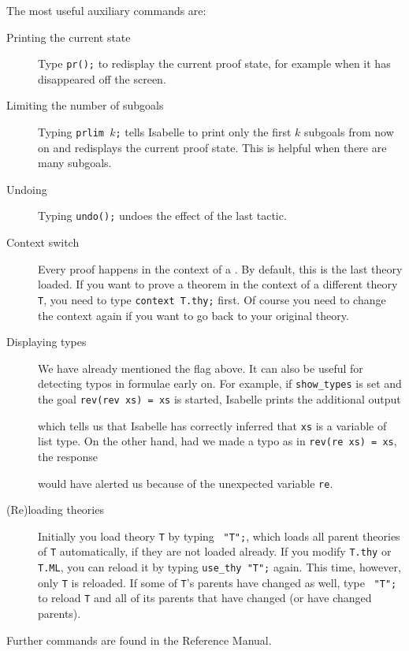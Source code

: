 The most useful auxiliary commands are:
\begin{description}
\item[Printing the current state]
Type \texttt{pr();} to redisplay the current proof state, for example when it
has disappeared off the screen.
\item[Limiting the number of subgoals]
Typing \texttt{prlim $k$;} tells Isabelle to print only the first $k$
subgoals from now on and redisplays the current proof state. This is helpful
when there are many subgoals.
\item[Undoing] Typing \texttt{undo();} undoes the effect of the last
tactic.
\item[Context switch] Every proof happens in the context of a
  . By default, this is the last theory loaded. If
  you want to prove a theorem in the context of a different theory
  \texttt{T}, you need to type \texttt{context T.thy;}
  first. Of course you need to change the context again if you want to go
  back to your original theory.
\item[Displaying types] We have already mentioned the flag
   above. It can also be useful for detecting typos in
  formulae early on. For example, if \texttt{show_types} is set and the goal
  \texttt{rev(rev xs) = xs} is started, Isabelle prints the additional output
\begin{ttbox}
\end{ttbox}
which tells us that Isabelle has correctly inferred that
\texttt{xs} is a variable of list type. On the other hand, had we
made a typo as in \texttt{rev(re xs) = xs}, the response
\begin{ttbox}
\end{ttbox}
would have alerted us because of the unexpected variable \texttt{re}.
\item[(Re)loading theories]
Initially you load theory \texttt{T} by typing ~\texttt{"T";},
which loads all parent theories of \texttt{T} automatically, if they are not
loaded already. If you modify \texttt{T.thy} or \texttt{T.ML}, you can
reload it by typing \texttt{use_thy~"T";} again. This time, however, only
\texttt{T} is reloaded. If some of \texttt{T}'s parents have changed as well,
type ~\texttt{"T";} to reload \texttt{T} and all of
its parents that have changed (or have changed parents).
\end{description}
Further commands are found in the Reference Manual.


